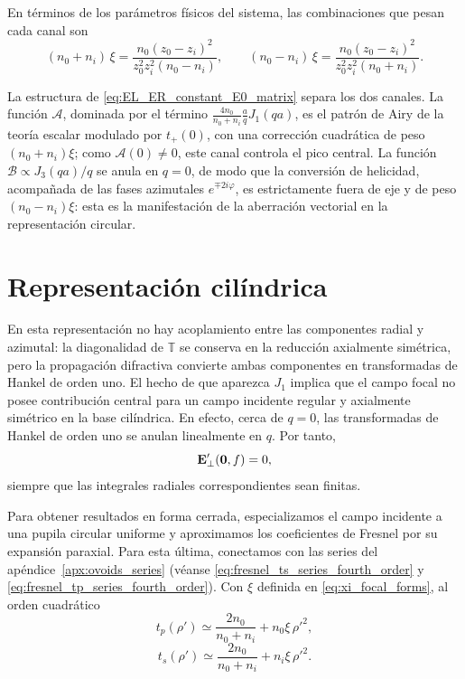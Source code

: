 En términos de los parámetros físicos del sistema, las combinaciones que pesan cada canal son
\begin{equation}
  (n_0+n_i)\,\xi
  =
  \frac{
    n_0(z_0-z_i)^2
  }{
    z_0^2 z_i^2 (n_0-n_i)
  },
  \qquad
  (n_0-n_i)\,\xi
  =
  \frac{
    n_0(z_0-z_i)^2
  }{
    z_0^2 z_i^2 (n_0+n_i)
  }.
  \label{eq:xi_combinations_physical}
\end{equation}

La estructura de \eqref{eq:EL_ER_constant_E0_matrix} separa los dos canales. La función $\mathcal A$, dominada por el término $\tfrac{4n_0}{n_0+n_i}\tfrac{a}{q}J_1(qa)$, es el patrón de Airy de la teoría escalar modulado por $t_+(0)$, con una corrección cuadrática de peso $(n_0+n_i)\xi$; como $\mathcal A(0)\neq 0$, este canal controla el pico central. La función $\mathcal B\propto J_3(qa)/q$ se anula en $q=0$, de modo que la conversión de helicidad, acompañada de las fases azimutales $e^{\mp 2i\varphi}$, es estrictamente fuera de eje y de peso $(n_0-n_i)\xi$: esta es la manifestación de la aberración vectorial en la representación circular.

\section{Representación cilíndrica}

En esta representación no hay acoplamiento entre las componentes radial y azimutal: la diagonalidad de \(\mathbb T\) se conserva en la reducción axialmente simétrica, pero la propagación difractiva convierte ambas componentes en transformadas de Hankel de orden uno. El hecho de que aparezca \(J_1\) implica que el campo focal no posee contribución central para un campo incidente regular y axialmente simétrico en la base cilíndrica. En efecto, cerca de \(q=0\), las transformadas de Hankel de orden uno se anulan linealmente en \(q\). Por tanto,
\begin{equation}
  \vb E'_\perp(\vb 0,f)=0,
\end{equation}
siempre que las integrales radiales correspondientes sean finitas.

Para obtener resultados en forma cerrada, especializamos el campo incidente a una pupila circular uniforme y aproximamos los coeficientes de Fresnel por su expansión paraxial. Para esta última, conectamos con las series del apéndice~\ref{apx:ovoids_series} (véanse \eqref{eq:fresnel_ts_series_fourth_order} y \eqref{eq:fresnel_tp_series_fourth_order}). Con $\xi$ definida en \eqref{eq:xi_focal_forms}, al orden cuadrático
\begin{equation}
  t_p(\rho')
  \simeq
  \frac{2n_0}{n_0+n_i}
  +
  n_0\xi\,\rho'^2,
  \label{eq:tp_paraxial_cylindrical}
\end{equation}
\begin{equation}
  t_s(\rho')
  \simeq
  \frac{2n_0}{n_0+n_i}
  +
  n_i\xi\,\rho'^2.
  \label{eq:ts_paraxial_cylindrical}
\end{equation}

